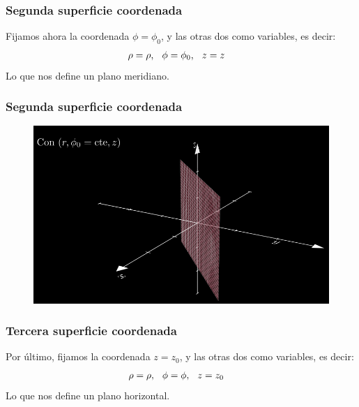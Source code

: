 \documentclass[12pt]{beamer}
\begin{document}
\begin{frame}
\frametitle{Segunda superficie coordenada}
Fijamos ahora la coordenada $\phi = \phi_{0}$, y las otras dos como variables, es decir:
\begin{align*}
\rho &= \rho, \hspace{0.25cm} \phi = \phi_{0}, \hspace{0.25cm} z = z
\end{align*}
\pause
Lo que nos define un plano meridiano.
\end{frame}
{ %
\begin{frame}
\frametitle{Segunda superficie coordenada}
\begin{figure}
   \centering
   \includegraphics[width=0.95\linewidth]{Imagenes/superficies_cilindricas_02.png}
   \label{fig:superficies_cilindricas_02}
\end{figure}
\end{frame}
}
\begin{frame}
\frametitle{Tercera superficie coordenada}
Por último, fijamos la coordenada $z = z_{0}$, y las otras dos como variables, es decir:
\begin{align*}
\rho &= \rho, \hspace{0.25cm} \phi = \phi, \hspace{0.25cm} z = z_{0}
\end{align*}
\pause
Lo que nos define un plano horizontal.
\end{frame}
\end{document}
